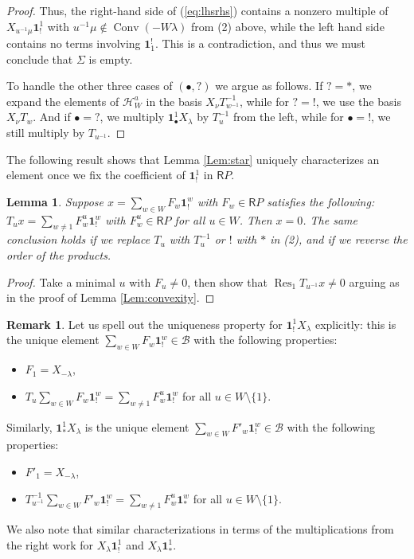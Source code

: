 \documentclass{amsart}
\newcommand{\Ring}{\mathsf{R}}
\newcommand{\bone}{\mathbf{1}}
\newtheorem{Lem}[Thm]{Lemma}
\theoremstyle{definition}
\newtheorem{Rem}[Thm]{Remark}
\numberwithin{equation}{section}
\begin{document}
\begin{proof}
Thus, the right-hand side of (\ref{eq:lhsrhs}) contains a nonzero multiple of$X_{u^{-1}\mu}\bone_!^1$ with $u^{-1}\mu \notin \operatorname{Conv}(-W\lambda)$ from (2) above, while the left hand side contains no terms involving $\bone^!_1$. This is a contradiction, and thus we must conclude that $\Sigma$ is empty.

To handle the other three cases of $(\bullet,?)$ we argue as follows. If $?=*$, we expand the elements of $\mathcal{H}^a_W$ in the basis $X_\nu T_{w^{-1}}^{-1}$, while for $?=!$, we use the basis $X_\nu T_w$. And if $\bullet=?$, we multiply $\bone^1_\bullet X_\lambda$ by $T_{u}^{-1}$ from the left, while for $\bullet=!$, we still multiply by $T_{u^{-1}}$.
\end{proof}

The following result shows that Lemma \ref{Lem:star} uniquely characterizes an element once we fix the coefficient of $\bone_!^1$ in $\Ring P$.

\begin{Lem}\label{Lem:uniqueness_conjugation}
Suppose $x=\sum_{w\in W}F_w \bone_!^w$ with $F_w\in \Ring P$ satisfies the following:
 $T_u x=\sum_{w\neq 1}F_w^u \bone_!^w$ with $F_w^u\in \Ring P$ for all $u\in W$.
Then $x=0$. The same conclusion holds if we replace $T_{u}$ with $T_u^{-1}$ or $!$ with $*$ in (2), and if we reverse the order of the products.
\end{Lem}
\begin{proof}
Take a minimal $u$ with $F_u\neq 0$, {then show that $\operatorname{Res}_1{T_{u^{-1}}}x\neq 0$ arguing} as in the proof of Lemma \ref{Lem:convexity}.
\end{proof}

\begin{Rem}\label{Rem:uniqueness}
Let us spell out the uniqueness property for $\bone_!^1 X_\lambda$ explicitly: this is the unique element $\sum_{w\in W}F_w\bone_!^w\in\mathcal{B}$ with the following properties:
\begin{itemize}
\item[(!1)] $F_1=X_{-\lambda}$,
\item[(!2)]  $T_u\sum_{w\in W}F_w\bone_!^w=\sum_{w\neq 1}F^u_w\bone_!^w$ for all $u\in W\setminus \{1\}$.
\end{itemize}
Similarly, $\bone_*^1 X_\lambda$
is the unique element $\sum_{w\in W}F'_w\bone_!^w\in\mathcal{B}$ with the following properties:
\begin{itemize}
\item[($*1$)] $F'_1=X_{-\lambda}$,
\item[($*2$)]  $T_{u^{-1}}^{-1}\sum_{w\in W}F'_w\bone_!^w=\sum_{w\neq 1}F^u_w \bone^w_*$ for all $u\in W\setminus \{1\}$.
\end{itemize}
We also note that similar characterizations in terms of the multiplications from the right work for $X_\lambda \bone_!^1$ and $X_\lambda\bone_*^1$.
\end{Rem}
\end{document}

